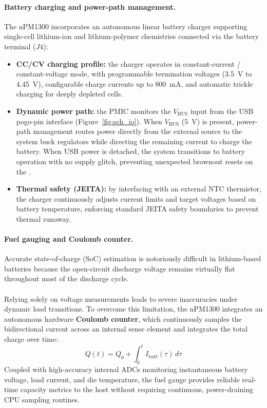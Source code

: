 \documentclass[12pt, a4paper]{article}
\begin{document}
\paragraph{Battery charging and power-path management.}
The nPM1300 incorporates an autonomous linear battery charger supporting
single-cell lithium-ion and lithium-polymer chemistries connected via the
battery terminal ($J4$):
\begin{itemize}
    \item \textbf{CC/CV charging profile:} the charger operates in constant-current / constant-voltage mode, with programmable termination voltages (\SI{3.5}{\volt} to \SI{4.45}{\volt}), configurable charge currents up to \SI{800}{\milli\ampere}, and automatic trickle charging for deeply depleted cells.
    \item \textbf{Dynamic power path:} the PMIC monitors the $V_{\text{BUS}}$ input from the USB pogo-pin interface (Figure~\ref{fig:sch_io}). When $V_{\text{BUS}}$ (\SI{5}{\volt}) is present, power-path management routes power directly from the external source to the system buck regulators while directing the remaining current to charge the battery. When USB power is detached, the system transitions to battery operation with no supply glitch, preventing unexpected brownout resets on the .
    \item \textbf{Thermal safety (JEITA):} by interfacing with an external NTC thermistor, the charger continuously adjusts current limits and target voltages based on battery temperature, enforcing standard JEITA safety boundaries to prevent thermal runaway.
\end{itemize}

\paragraph{Fuel gauging and Coulomb counter.}
Accurate state-of-charge (SoC) estimation is notoriously difficult in
lithium-based batteries because the open-circuit discharge voltage remains
virtually flat throughout most of the discharge cycle.\\\\
Relying solely on voltage
measurements leads to severe inaccuracies under dynamic load transitions. To
overcome this limitation, the nPM1300 integrates an autonomous hardware
\textbf{Coulomb counter}, which continuously samples the bidirectional current
across an internal sense element and integrates the total charge over time:
$$Q(t) = Q_0 + \int_{0}^{t} I_{\text{batt}}(\tau)\, d\tau$$
Coupled with high-accuracy internal ADCs monitoring instantaneous battery
voltage, load current, and die temperature, the fuel gauge provides reliable
real-time capacity metrics to the host without requiring continuous,
power-draining CPU sampling routines.
\end{document}

